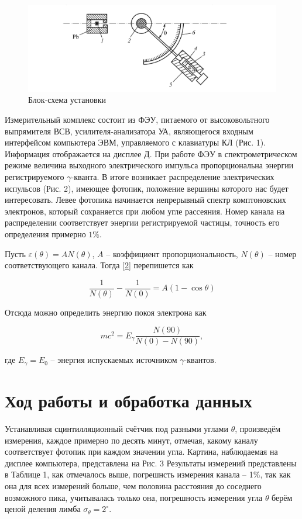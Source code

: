 \documentclass[15pt,a5paper,reqno]{article}
\begin{document}
\begin{figure}[h!]
  \centering
  \includegraphics[width=1.0\linewidth]{pics/lab_5_1_2.png}
  \caption{Блок-схема установки}
\label{grph}
\end{figure}
Измерительный комплекс состоит из ФЭУ, питаемого от высоковольтного выпрямителя ВСВ, усилителя-анализатора УА, являющегося входным интерфейсом компьютера ЭВМ, управляемого с клавиатуры КЛ (Рис. 1). Информация отображается на дисплее Д. При работе ФЭУ в спектрометрическом режиме величина выходного электрического импульса пропорциональна энергии регистрируемого $\gamma$-кванта. В итоге возникает распределение электрических испульсов (Рис. 2), имеющее фотопик, положение вершины которого нас будет интересовать. Левее фотопика начинается непрерывный спектр комптоновских электронов, который сохраняется при любом угле рассеяния. Номер канала на распределении соответствует энергии регистрируемой частицы, точность его определения примерно $1\%$.

Пусть $\varepsilon(\theta) = AN(\theta)$, $A$ -- коэффициент пропорциональность, $N(\theta)$ -- номер соответствующего канала. Тогда \eqref{2} перепишется как

\begin{equation}\label{3}
  \dfrac{1}{N(\theta)} - \dfrac{1}{N(0)} = A(1-\cos \theta)
\end{equation}

Отсюда можно определить энергию покоя электрона как 

\begin{equation}\label{4}
    mc^2 = E_\gamma \dfrac{N(90)}{N(0) - N(90)},
\end{equation}

где $E_\gamma = E_0$ -- энергия испускаемых источником $\gamma$-квантов.

\section{Ход работы и обработка данных}

Устанавливая сцинтилляционный счётчик под разными углами $\theta$, произведём измерения, каждое примерно по десять минут, отмечая, какому каналу соответствует фотопик при каждом значении угла. Картина, наблюдаемая на дисплее компьютера, представлена на Рис. 3
Результаты измерений представлены в Таблице 1, как отмечалось выше, погрешнсть измерения канала -- 1\%, так как она для всех измерений больше, чем половина расстояния до соседнего возможного пика, учитывалась только она, погрешность измерения угла $\theta$ берём ценой деления лимба $\sigma_\theta = 2^\circ$.
\end{document}
